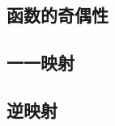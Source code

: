 \subsection{函数的奇偶性}
\begin{Practice}
  \begin{question}
    \item 
    \item 
    \item 
    \item 
    \item 
  \end{question}
\end{Practice}

\begin{Exercise}
  \begin{question}
    \item 
    \item 
    \item 
    \item 
    \item 
    \item 
    \item 
    \item 
    \item 
    \item 
    \item 
    \item 
  \end{question}
\end{Exercise}

\subsection{一一映射}
\begin{Practice}
  \begin{question}
    \item 
    \item 
    \item 
    \item 
  \end{question}
\end{Practice}
\subsection{逆映射}
\begin{Practice}
  \begin{question}
    \item 
    \item 
    \item 
  \end{question}
\end{Practice}
